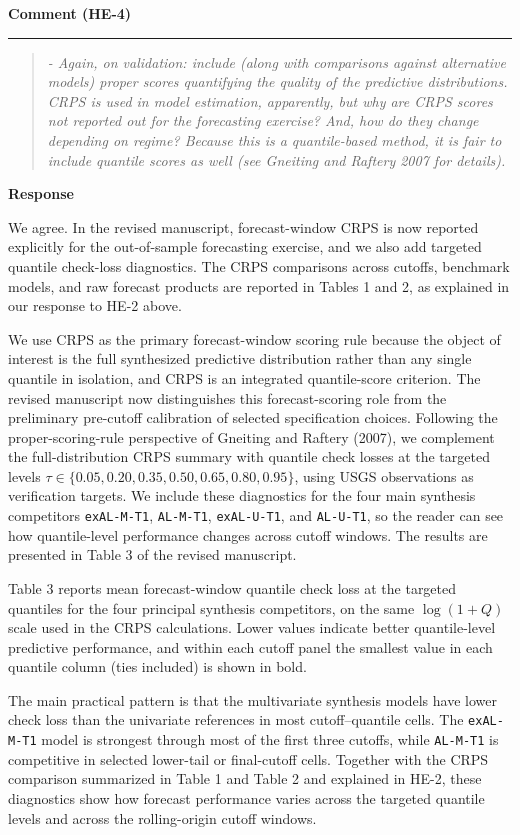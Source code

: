 \documentclass[11pt,letterpaper]{article}
\newcommand{\commentheading}[1]{%
  \vspace{6pt}\noindent\textbf{Comment (#1)}\par
  \vspace{2pt}\hrule\vspace{6pt}
}
\newenvironment{commentblock}{\begin{quote}\small\itshape}{\end{quote}}
\newcommand{\responseheading}{%
  \vspace{2pt}\noindent\textbf{Response}\par
}
\newenvironment{responsebox}{\begin{mdframed}[style=plainbox]}{\end{mdframed}}
\newcommand{\HE}[1]{HE-#1}
\begin{document}
\commentheading{\HE{4}}
\begin{commentblock}
- Again, on validation: include (along with comparisons against alternative models) proper scores quantifying the quality of the predictive distributions. CRPS is used in model estimation, apparently, but why are CRPS scores not reported out for the forecasting exercise? And, how do they change depending on regime? Because this is a quantile-based method, it is fair to include quantile scores as well (see Gneiting and Raftery 2007 for details).
\end{commentblock}

\responseheading
\begin{responsebox}
We agree. In the revised manuscript, forecast-window CRPS is now reported explicitly for the out-of-sample forecasting exercise, and we also add targeted quantile check-loss diagnostics. The CRPS comparisons across cutoffs, benchmark models, and raw forecast products are reported in Tables 1 and 2, as explained in our response to HE-2 above.

We use CRPS as the primary forecast-window scoring rule because the object of interest is the full synthesized predictive distribution rather than any single quantile in isolation, and CRPS is an integrated quantile-score criterion. The revised manuscript now distinguishes this forecast-scoring role from the preliminary pre-cutoff calibration of selected specification choices. Following the proper-scoring-rule perspective of Gneiting and Raftery (2007), we complement the full-distribution CRPS summary with quantile check losses at the targeted levels \(\tau\in\{0.05,0.20,0.35,0.50,0.65,0.80,0.95\}\), using USGS observations as verification targets. We include these diagnostics for the four main synthesis competitors \texttt{exAL-M-T1}, \texttt{AL-M-T1}, \texttt{exAL-U-T1}, and \texttt{AL-U-T1}, so the reader can see how quantile-level performance changes across cutoff windows. The results are presented in Table 3 of the revised manuscript.

\medskip
\noindent Table 3 reports mean forecast-window quantile check loss at the targeted quantiles for the four principal synthesis competitors, on the same \(\log(1+Q)\) scale used in the CRPS calculations. Lower values indicate better quantile-level predictive performance, and within each cutoff panel the smallest value in each quantile column (ties included) is shown in bold.\par

The main practical pattern is that the multivariate synthesis models have lower check loss than the univariate references in most cutoff--quantile cells. The \texttt{exAL-M-T1} model is strongest through most of the first three cutoffs, while \texttt{AL-M-T1} is competitive in selected lower-tail or final-cutoff cells. Together with the CRPS comparison summarized in Table 1 and Table 2 and explained in HE-2, these diagnostics show how forecast performance varies across the targeted quantile levels and across the rolling-origin cutoff windows.

\end{responsebox}
\end{document}
